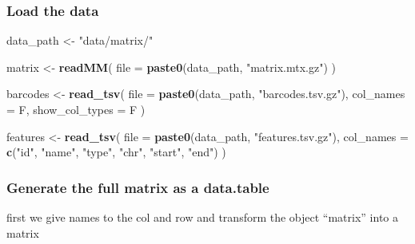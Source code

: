 \documentclass[]{article}
\newenvironment{Shaded}{\begin{snugshade}}{\end{snugshade}}
\newcommand{\DataTypeTok}[1]{\textcolor[rgb]{0.13,0.29,0.53}{#1}}
\newcommand{\KeywordTok}[1]{\textcolor[rgb]{0.13,0.29,0.53}{\textbf{#1}}}
\newcommand{\NormalTok}[1]{#1}
\newcommand{\OperatorTok}[1]{\textcolor[rgb]{0.81,0.36,0.00}{\textbf{#1}}}
\newcommand{\StringTok}[1]{\textcolor[rgb]{0.31,0.60,0.02}{#1}}
\begin{document}
\hypertarget{load-the-data}{%
\subsubsection{Load the data}\label{load-the-data}}

\begin{Shaded}
\begin{Highlighting}[]
\NormalTok{data_path <-}\StringTok{ "data/matrix/"}

\NormalTok{matrix <-}\StringTok{ }\KeywordTok{readMM}\NormalTok{(}
  \DataTypeTok{file =} \KeywordTok{paste0}\NormalTok{(data_path, }\StringTok{"matrix.mtx.gz"}\NormalTok{)}
\NormalTok{  )}

\NormalTok{barcodes <-}\StringTok{ }\KeywordTok{read_tsv}\NormalTok{(}
  \DataTypeTok{file =} \KeywordTok{paste0}\NormalTok{(data_path, }\StringTok{"barcodes.tsv.gz"}\NormalTok{), }
  \DataTypeTok{col_names =}\NormalTok{ F, }
  \DataTypeTok{show_col_types =}\NormalTok{ F}
\NormalTok{  )}

\NormalTok{features <-}\StringTok{ }\KeywordTok{read_tsv}\NormalTok{(}
  \DataTypeTok{file =} \KeywordTok{paste0}\NormalTok{(data_path, }\StringTok{"features.tsv.gz"}\NormalTok{), }
  \DataTypeTok{col_names =} \KeywordTok{c}\NormalTok{(}\StringTok{"id"}\NormalTok{, }\StringTok{"name"}\NormalTok{, }\StringTok{"type"}\NormalTok{, }\StringTok{"chr"}\NormalTok{, }\StringTok{"start"}\NormalTok{, }\StringTok{"end"}\NormalTok{)}
\NormalTok{  )}
\end{Highlighting}
\end{Shaded}

\hypertarget{generate-the-full-matrix-as-a-data.table}{%
\subsubsection{Generate the full matrix as a
data.table}\label{generate-the-full-matrix-as-a-data.table}}

first we give names to the col and row and transform the object
``matrix'' into a matrix

\begin{Shaded}
\end{Shaded}
\end{document}
